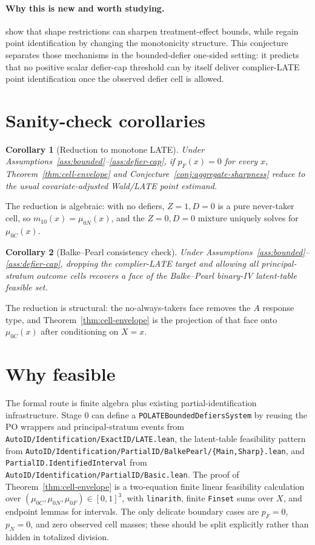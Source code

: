 \documentclass[11pt]{article}
\theoremstyle{definition}
\theoremstyle{plain}
\newtheorem{corollary}{Corollary}
\theoremstyle{remark}
\begin{document}
\paragraph{Why this is new and worth studying.}
\citet{ManskiPepper2000} show that shape restrictions can sharpen treatment-effect bounds, while \citet{DahlHuberMellace2023} regain point identification by changing the monotonicity structure.  This conjecture separates those mechanisms in the bounded-defier one-sided setting: it predicts that no positive scalar defier-cap threshold can by itself deliver complier-LATE point identification once the observed defier cell is allowed.

\section{Sanity-check corollaries}
\begin{corollary}[Reduction to monotone LATE]\label{cor:monotone}
Under Assumptions~\ref{ass:bounded}--\ref{ass:defier-cap}, if \(p_F(x)=0\) for every \(x\), Theorem~\ref{thm:cell-envelope} and Conjecture~\ref{conj:aggregate-sharpness} reduce to the usual covariate-adjusted Wald/LATE point estimand.
\end{corollary}
The reduction is algebraic: with no defiers, \(Z=1,D=0\) is a pure never-taker cell, so \(m_{10}(x)=\mu_{0N}(x)\), and the \(Z=0,D=0\) mixture uniquely solves for \(\mu_{0C}(x)\).

\begin{corollary}[Balke--Pearl consistency check]\label{cor:bp}
Under Assumptions~\ref{ass:bounded}--\ref{ass:defier-cap}, dropping the complier-LATE target and allowing all principal-stratum outcome cells recovers a face of the Balke--Pearl binary-IV latent-table feasible set.
\end{corollary}
The reduction is structural: the no-always-takers face removes the \(A\) response type, and Theorem~\ref{thm:cell-envelope} is the projection of that face onto \(\mu_{0C}(x)\) after conditioning on \(X=x\).

\section{Why feasible}
The formal route is finite algebra plus existing partial-identification infrastructure.  Stage 0 can define a \texttt{POLATEBoundedDefiersSystem} by reusing the PO wrappers and principal-stratum events from \texttt{AutoID/Identification/ExactID/LATE.lean}, the latent-table feasibility pattern from \texttt{AutoID/Identification/PartialID/BalkePearl/\{Main,Sharp\}.lean}, and \texttt{PartialID.IdentifiedInterval} from \texttt{AutoID/Identification/PartialID/Basic.lean}.  The proof of Theorem~\ref{thm:cell-envelope} is a two-equation finite linear feasibility calculation over \((\mu_{0C},\mu_{0N},\mu_{0F})\in[0,1]^3\), with \texttt{linarith}, finite \texttt{Finset} sums over \(X\), and endpoint lemmas for intervals.  The only delicate boundary cases are \(p_F=0\), \(p_N=0\), and zero observed cell masses; these should be split explicitly rather than hidden in totalized division.
\end{document}
